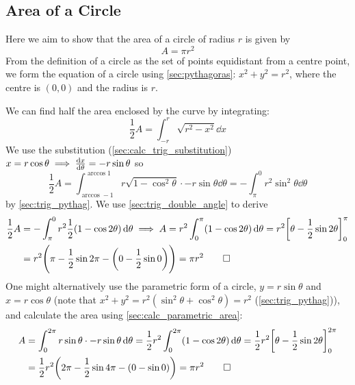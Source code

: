 \documentclass[fleqn,a4paper,11pt]{article}
\begin{document}
    \subsection{Area of a Circle}


    Here we aim to show that the area of a circle of radius \(r\) is given by
    \begin{equation}
    A = \pi r^2
    \end{equation}
    From the definition of a circle as the set of points equidistant from a
    centre point, we form the equation of a circle using \ref{sec:pythagoras}:
    \(x^2 + y^2 = r^2\), where the centre is \((0, 0)\) and the radius is \(r\).

    We can find half the area enclosed by the curve by integrating:
    \begin{equation*}
    \frac 12 A = \int_{-r}^r \sqrt{r^2 - x^2} \dd{x}
    \end{equation*}
    We use the substitution (\ref{sec:calc_trig_substitution})
    \(x = r \cos \theta \implies \dv{x}{\theta} = -r \sin \theta\) so
    \begin{equation*}
    \frac 12 A = \int_{\arccos -1}^{\arccos 1}
        r\sqrt{1 - \cos^2 \theta} \cdot -r \sin \theta \dd{\theta}
      = -\int_\pi^0 r^2 \sin^2 \theta \dd{\theta}
    \end{equation*}
    by \ref{sec:trig_pythag}. We use \ref{sec:trig_double_angle} to derive
    \begin{align*}
    \frac 12 A &= -\int_\pi^0
        r^2 \frac 12 (1 - \cos 2 \theta) \dd{\theta} \implies
     A = r^2 \int_0^\pi (1 - \cos 2 \theta) \dd{\theta} =
     r^2\bqty{\theta - \frac 12 \sin 2 \theta}_0^\pi \\
     &= r^2 \pqty{\pi - \frac 12 \sin 2 \pi -
                   \pqty{0 - \frac 12 \sin 0}} = \pi r^2 \qed
    \end{align*}
    One might alternatively use the parametric form of a circle,
    \(y = r \sin \theta\) and \(x = r \cos \theta\)
    (note that \(x^2 + y^2 = r^2(\sin^2 \theta + \cos^2 \theta) = r^2\)
    (\ref{sec:trig_pythag})), and calculate the area using
    \ref{sec:calc_parametric_area}:
    \begin{align*}
    A &= \int_0^{2\pi}
        r \sin \theta \cdot -r \sin \theta \dd{\theta} =
     \frac 12 r^2 \int_0^{2\pi} (1 - \cos 2 \theta) \dd{\theta} =
     \frac 12 r^2 \bqty{\theta - \frac 12 \sin 2 \theta}_0^{2\pi} \\
     &= \frac 12 r^2 \pqty{2\pi - \frac 12 \sin 4 \pi -
                      \pqty{0 - \sin 0}} = \pi r^2 \qed
    \end{align*}
\end{document}
